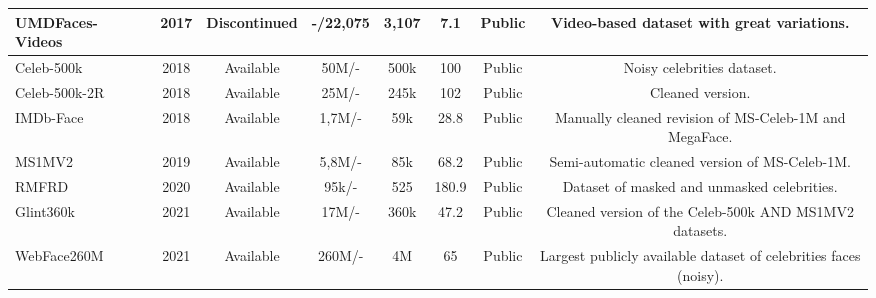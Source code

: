 \documentclass[class=report, crop=false, a4paper, 12pt]{standalone}
\begin{document}
\begin{table}[!ht]
{\begin{tabular}{|l|c|c|c|c|c|c|c|}
    UMDFaces-Videos~\autocite{bansalDonTsCNNbased2017}                        & 2017          & Discontinued                  & -/22,075               & 3,107          & 7.1                   & Public                & Video-based dataset with great variations.                 \\ \hline
    Celeb-500k~\autocite{caoCeleb500KLargeTraining2018}                             & 2018          & Available                  & 50M/-                  & 500k           & 100                   & Public                & Noisy celebrities dataset.                 \\ \hline
    Celeb-500k-2R~\autocite{caoCeleb500KLargeTraining2018}                          & 2018          & Available                  & 25M/-                  & 245k           & 102                   & Public                & Cleaned version.                 \\ \hline
    IMDb-Face~\autocite{wangDevilFaceRecognition2018}                              & 2018          & Available                  & 1,7M/-                 & 59k            & 28.8                  & Public                & Manually cleaned revision of MS-Celeb-1M and MegaFace.                 \\ \hline
    MS1MV2~\autocite{dengArcFaceAdditiveAngular}                                 & 2019          & Available                  & 5,8M/-                 & 85k            & 68.2                  & Public                & Semi-automatic cleaned version of MS-Celeb-1M.                 \\ \hline
    RMFRD~\autocite{wangMaskedFaceRecognition2020}                                 & 2020          & Available                  & 95k/-                  & 525            & 180.9                 & Public                & Dataset of masked and unmasked celebrities.                 \\ \hline
    Glint360k~\autocite{anPartialFCTraining2021}                              & 2021          & Available                  & 17M/-                  & 360k           & 47.2                  & Public                & Cleaned version of the Celeb-500k AND MS1MV2 datasets.                \\ \hline
    WebFace260M~\autocite{zhuWebFace260MBenchmarkUnveiling2021}                            & 2021          & Available                  & 260M/-                 & 4M             & 65                    & Public                & Largest publicly available dataset of celebrities faces (noisy).                 \\ \hline

\end{tabular}}
\end{table}
\end{document}

